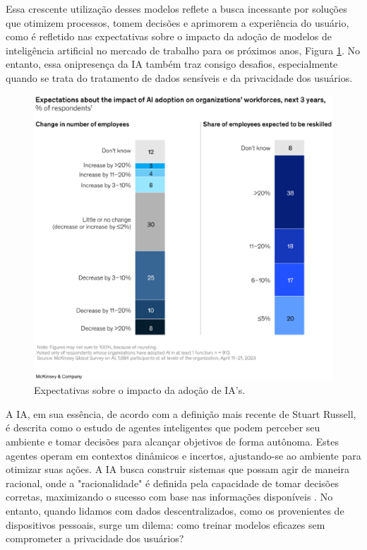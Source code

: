Essa crescente utilização desses modelos reflete a busca incessante por soluções que otimizem processos, tomem decisões e aprimorem a experiência do usuário, como é refletido nas expectativas sobre o impacto da adoção de modelos de inteligência artificial no mercado de trabalho para os próximos anos, Figura \ref{fig:capacidadeIA}. No entanto, essa onipresença da IA também traz consigo desafios, especialmente quando se trata do tratamento de dados sensíveis e da privacidade dos usuários.

\begin{figure}[h]
    \centering
    \includegraphics[scale = 0.8]{figuras/introducao/ExpectationsAboutImpact.eps}
    \caption{Expectativas sobre o impacto da adoção de IA's.}
    \label{fig:capacidadeIA}
\end{figure}

A IA, em sua essência, de acordo com a definição mais recente de Stuart Russell, é descrita como o estudo de agentes inteligentes que podem perceber seu ambiente e tomar decisões para alcançar objetivos de forma autônoma. Estes agentes operam em contextos dinâmicos e incertos, ajustando-se ao ambiente para otimizar suas ações. A IA busca construir sistemas que possam agir de maneira racional, onde a "racionalidade" é definida pela capacidade de tomar decisões corretas, maximizando o sucesso com base nas informações disponíveis \cite{russell2022}. No entanto, quando lidamos com dados descentralizados, como os provenientes de dispositivos pessoais, surge um dilema: como treinar modelos eficazes sem comprometer a privacidade dos usuários?

